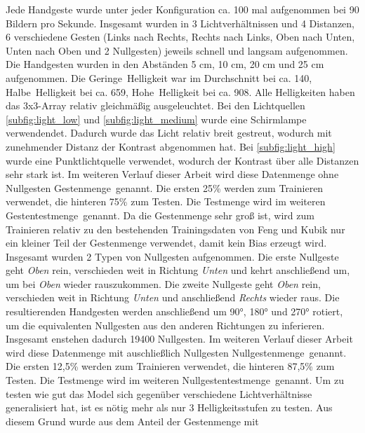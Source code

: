 Jede Handgeste wurde unter jeder Konfiguration ca. 100 mal aufgenommen bei 90 Bildern pro Sekunde. Insgesamt wurden in 3 Lichtverhältnissen und 4 Distanzen, 6 verschiedene Gesten (Links nach Rechts,
Rechts nach Links, Oben nach Unten, Unten nach Oben und 2 Nullgesten) jeweils schnell und langsam aufgenommen. Die Handgesten wurden in den Abständen 5 cm, 10 cm, 20 cm und 25 cm aufgenommen.
\newline
\newline
Die \glqq Geringe\grqq\ Helligkeit war im Durchschnitt bei ca. 140, \glqq Halbe\grqq\ Helligkeit bei ca. 659, \glqq Hohe\grqq\ Helligkeit bei ca. 908. Alle Helligkeiten haben das 3x3-Array
relativ gleichmäßig ausgeleuchtet. Bei den Lichtquellen \ref{subfig:light_low} und \ref{subfig:light_medium} wurde eine Schirmlampe verwendendet. Dadurch wurde das Licht relativ breit gestreut,
wodurch mit zunehmender Distanz der Kontrast abgenommen hat. Bei \ref{subfig:light_high} wurde eine Punktlichtquelle verwendet, wodurch der Kontrast über alle Distanzen sehr stark ist.
Im weiteren Verlauf dieser Arbeit wird diese Datenmenge ohne Nullgesten \glqq Gestenmenge\grqq\ genannt. Die ersten 25\% werden zum Trainieren verwendet, die hinteren 75\% zum Testen. Die Testmenge
wird im weiteren \glqq Gestentestmenge\grqq\ genannt. Da die Gestenmenge sehr groß ist, wird zum Trainieren relativ zu den bestehenden Trainingsdaten von Feng und Kubik nur ein kleiner Teil der Gestenmenge verwendet,
damit kein Bias erzeugt wird.
\newline
\newline
Insgesamt wurden 2 Typen von Nullgesten aufgenommen. Die erste Nullgeste geht \textit{Oben} rein, verschieden weit in Richtung \textit{Unten} und kehrt anschließend um, um bei \textit{Oben} wieder rauszukommen.
Die zweite Nullgeste geht \textit{Oben} rein, verschieden weit in Richtung \textit{Unten} und anschließend \textit{Rechts} wieder raus. Die resultierenden Handgesten werden anschließend um 90°, 180° und
270° rotiert, um die equivalenten Nullgesten aus den anderen Richtungen zu inferieren. Insgesamt enstehen dadurch 19400 Nullgesten. Im weiteren Verlauf dieser Arbeit wird diese Datenmenge mit auschließlich
Nullgesten \glqq Nullgestenmenge\grqq\ genannt. Die ersten 12,5\% werden zum Trainieren verwendet, die hinteren 87,5\% zum Testen. Die Testmenge wird im weiteren \glqq Nullgestentestmenge\grqq\ genannt.
\newline
\newline
Um zu testen wie gut das Model sich gegenüber verschiedene Lichtverhältnisse generalisiert hat, ist es nötig mehr als nur 3 Helligkeitsstufen zu testen. Aus diesem Grund wurde aus dem Anteil der Gestenmenge mit
